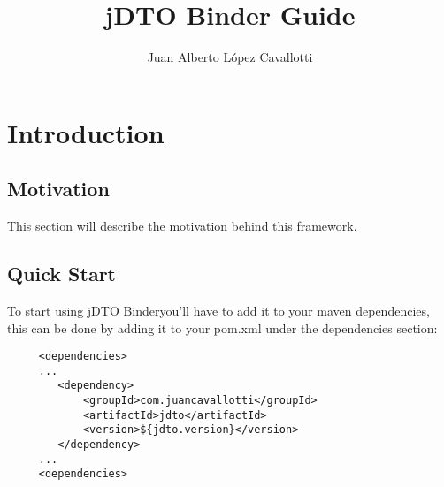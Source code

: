 \documentclass[12pt]{article}
\title{jDTO Binder Guide}
\author{Juan Alberto López Cavallotti}
\newcommand{\JDTO}{jDTO Binder}
\begin{document}
\maketitle
\tableofcontents

\section{Introduction}
\subsection{Motivation}
This section will describe the motivation behind this framework.

\subsection{Quick Start}
To start using \JDTO you'll have to add it to your maven dependencies, this can be done
by adding it to your pom.xml under the dependencies section:

\begin{verbatim}
     <dependencies>
     ...
        <dependency>
            <groupId>com.juancavallotti</groupId>
            <artifactId>jdto</artifactId>
            <version>${jdto.version}</version>
        </dependency>
     ...
     <dependencies>
\end{verbatim}
\end{document}
